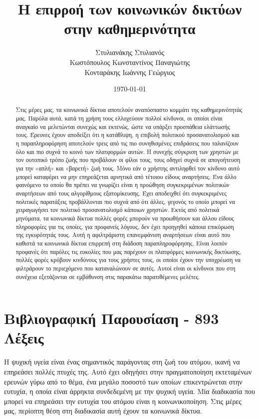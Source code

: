 \documentclass{article}
\title{Η επιρροή των κοινωνικών δικτύων στην καθημερινότητα}
\author{Στυλιανάκης Στυλιανός \\
Κωστόπουλος Κωνσταντίνος Παναγιώτης \\
Κονταράκης Ιωάννης Γεώργιος
}
\date{\today}
\begin{document}
\maketitle  
\begin{abstract}
Στις μέρες μας, τα κοινωνικά δίκτυα αποτελούν αναπόσπαστο κομμάτι της καθημερινότητάς μας. Παρόλα αυτά, κατά τη χρήση τους ελλοχεύουν πολλοί κίνδυνοι, οι οποίοι είναι αναγκαίο να μελετώνται συνεχώς και εκτενώς, ώστε να υπάρξει προσπάθεια ελάττωσής τους. Έρευνες έχουν αποδείξει ότι η κατάθλιψη, η επιβολή πολιτικού προσανατολισμού και η παραπληροφόρηση αποτελούν τρεις από τις πιο συνηθισμένες επιδράσεις που ταλανίζουν όλο και πιο συχνά το κοινό των πλατφορμών αυτών. Η συνεχής σύγκριση των χρηστών με τον ουτοπικό τρόπο ζωής που προβάλουν οι φίλοι τους, τους οδηγεί συχνά σε απογοήτευση για την «απλή» και «βαρετή» ζωή τους. Μόνο εάν ο χρήστης αντιληφθεί τον κίνδυνο αυτό μπορεί καταφέρει να μην επηρεάζεται αρνητικά από τέτοιου είδους αναρτήσεις. Ένα άλλο φαινόμενο το οποίο θα πρέπει να γνωρίζει είναι η προώθηση συγκεκριμένων πολιτικών αναρτήσεων από τους αλγορίθμους εξατομίκευσης. Έχει αποδειχθεί ότι συγκεκριμένες πολιτικές παρατάξεις προβάλλονται πιο συχνά από ότι άλλες, γεγονός το οποίο μπορεί να χειραγωγήσει τον πολιτικό προσανατολισμό κάποιων χρηστών. Εκτός από πολιτικά μηνύματα, τα κοινωνικά δίκτυα πολλές φορές μπορούν να προωθήσουν και άλλου είδους πληροφορίες για τις οποίες, για προφανείς λόγους, δεν έχει προηγηθεί κάποια επικύρωση της εγκυρότητάς τους. Αυτή η αφιλτράριστη επανεμφάνιση αναρτήσεων είναι αυτό που καθιστά τα κοινωνικά δίκτυα επιρρεπή στη διάδοση παραπληροφόρησης. Είναι λοιπόν προφανές ότι παρόλες τις ευκολίες που μας παρέχουν οι πλατφόρμες κοινωνικής δικτύωσης, πολλές φορές κρύβουν κινδύνους για τους χρήστες τους, οι οποίοι έχουν την υποχρέωση να φιλτράρουν το περιεχόμενο που καταναλώνουν σε αυτές. Αυτοί είναι οι κίνδυνοι που στη συνέχεια εξετάζονται σε εμβάθυνση στις παρακάτω παρατιθέμενες μελέτες.
\end{abstract}
\clearpage 
\tableofcontents
\section{Βιβλιογραφική Παρουσίαση - 893 Λέξεις}
Η ψυχική υγεία είναι ένας σημαντικός παράγοντας στη ζωή του ατόμου, ικανή να επηρεάσει πολλές πτυχές της. Αυτό έχει οδηγήσει στην πραγματοποίηση εκτεταμένων ερευνών γύρω από το θέμα, ένα μεγάλο ποσοστό των οποίων επικεντρώνεται στην ευτυχία, η οποία είναι άρρηκτα συνδεδεμένη με την ψυχική υγεία. Μία διαδικασία που μπορεί να επηρεάσει την ευτυχία του ατόμου είναι η κοινωνικοποίηση. Στις μέρες μας, περίοπτη θέση στη διαδικασία αυτή έχουν τα κοινωνικά δίκτυα.
\end{document}
